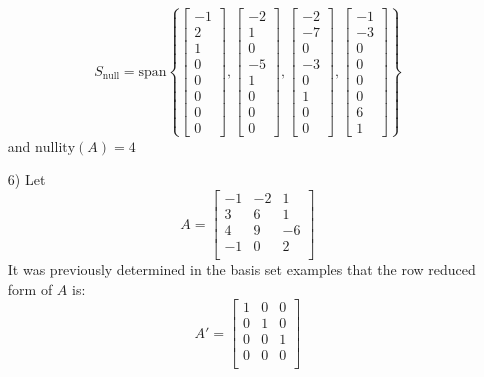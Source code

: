 \documentclass{article}
\begin{document}
\begin{itemize}
\[S_{\text{null}} = \text{span}\left\{\begin{bmatrix} -1 \\ 2 \\ 1 \\ 0 \\ 0 \\ 0 \\ 0 \\ 0 \end{bmatrix}, \begin{bmatrix} -2 \\ 1 \\ 0 \\ -5 \\ 1 \\ 0 \\ 0 \\ 0 \end{bmatrix}, \begin{bmatrix} -2 \\ -7 \\ 0 \\ -3 \\ 0 \\ 1 \\ 0 \\ 0 \end{bmatrix}, \begin{bmatrix} -1 \\ -3 \\ 0 \\ 0 \\ 0 \\ 0 \\ 6 \\ 1 \end{bmatrix}\right\}\]
and \(\text{nullity}(A) = 4\)
\item[6)] Let \[A = \begin{bmatrix}
-1 & -2 &  1 \\
 3 &  6 &  1 \\
 4 &  9 & -6 \\
-1 &  0 &  2 \\ 
\end{bmatrix}\]
It was previously determined in the basis set examples that the row reduced form of \(A\) is: 
\[A' = \begin{bmatrix}
1 & 0 & 0 \\
0 & 1 & 0 \\
0 & 0 & 1 \\
0 & 0 & 0 \\ 

\end{bmatrix}\]
\end{itemize}
\end{document}
